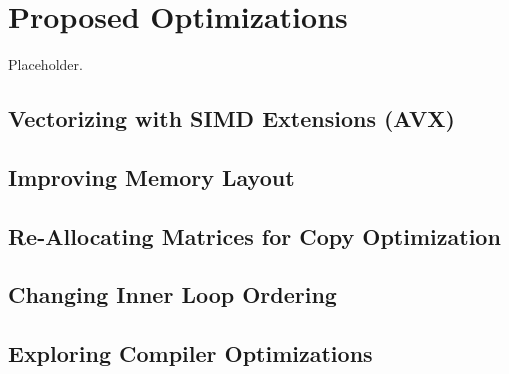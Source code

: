 
\section{Proposed Optimizations}
\label{sec-opts}

Placeholder.

\subsection{Vectorizing with SIMD Extensions (AVX)}


\subsection{Improving Memory Layout}


\subsection{Re-Allocating Matrices for Copy Optimization}


\subsection{Changing Inner Loop Ordering}


\subsection{Exploring Compiler Optimizations}

